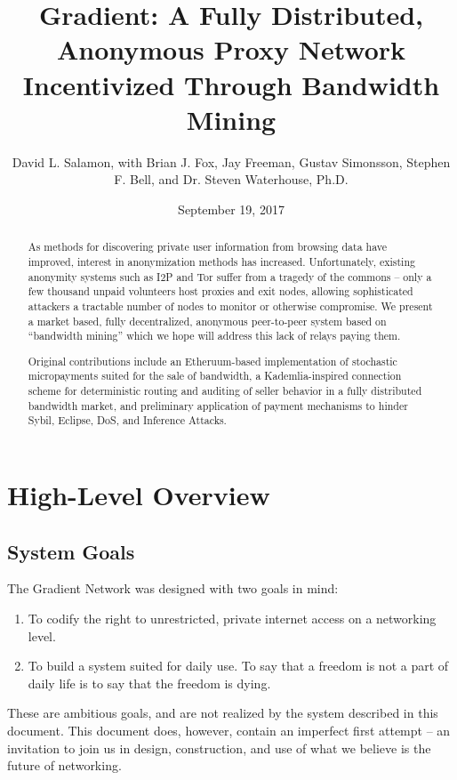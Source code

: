 \documentclass{article}
\title{Gradient: A Fully Distributed, Anonymous Proxy Network Incentivized Through Bandwidth Mining}
\author{David L. Salamon, with Brian J. Fox, Jay Freeman, Gustav Simonsson, Stephen F. Bell, and Dr. Steven Waterhouse, Ph.D.}
\date{September 19, 2017}
\begin{document}
\maketitle

\begin{abstract}
    As methods for discovering private user information from browsing data have improved, interest in anonymization methods has increased. Unfortunately, existing anonymity systems such as I2P and Tor suffer from a tragedy of the commons – only a few thousand unpaid volunteers host proxies and exit nodes, allowing sophisticated attackers a tractable number of nodes to monitor or otherwise compromise. We present a market based, fully decentralized, anonymous peer-to-peer system based on “bandwidth mining” which we hope will address this lack of relays paying them.

    Original contributions include an Etheruum-based implementation of stochastic micropayments suited for the sale of bandwidth, a Kademlia-inspired connection scheme for deterministic routing and auditing of seller behavior in a fully distributed bandwidth market, and preliminary application of payment mechanisms to hinder Sybil, Eclipse, DoS, and Inference Attacks.
    
    
\end{abstract}

\tableofcontents
\newpage




\section{High-Level Overview}
\subsection{System Goals}

The Gradient Network was designed with two goals in mind:
\begin{enumerate}
    \item To codify the right to unrestricted, private internet access on a networking level.
    \item To build a system suited for daily use. To say that a freedom is not a part of daily life is to say that the freedom is dying.
\end{enumerate}

These are ambitious goals, and are not realized by the system described in this document. This document does, however, contain an imperfect first attempt – an invitation to join us in design, construction, and use of what we believe is the future of networking.
\end{document}

